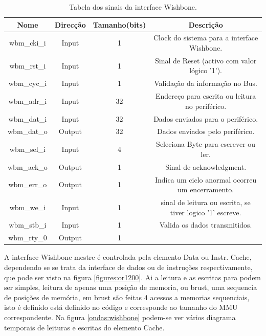 \begin{table}[h!]
  \begin{center}
    \begin{tabular}{|c|c|c|c|}
      \hline
      Nome & Direcção & Tamanho(bits) & Descrição \\
      \hline \hline
      wbm\_cki\_i & Input & 1 & Clock do sistema para a interface Wishbone. \\
      \hline
      wbm\_rst\_i & Input & 1 & Sinal de Reset (activo com valor lógico '1'). \\ 
      \hline
      wbm\_cyc\_i & Input & 1 & Validação da informação no Bus.\\ %
      \hline
      wbm\_adr\_i & Input & 32 & Endereço para escrita ou leitura no periférico.\\
      \hline
      wbm\_dat\_i & Input & 32 & Dados enviados para o periférico.\\
      \hline
      wbm\_dat\_o & Output & 32 & Dados enviados pelo periférico.\\
      \hline
      wbm\_sel\_i & Input & 4 & Seleciona Byte para escrever ou ler.\\ %
      \hline
      wbm\_ack\_o & Output & 1 & Sinal de acknowledgment. \\
      \hline
      wbm\_err\_o & Output & 1 & Indica um ciclo anormal ocorreu um encerramento.\\
      \hline
      wbm\_we\_i & Input & 1 & sinal de leitura ou escrita, se tiver logico '1' escreve.\\
      \hline
      wbm\_stb\_i & Input & 1 & Valida os dados transmitidos.\\
      \hline
      wbm\_rty\_0 & Output & 1 & \\
      \hline
    \end{tabular}
  \end{center}
  \caption[Tabela dos sinais da interface Wishbone.]{Tabela dos sinais da interface Wishbone.}
  \label{table:wishbone}
\end{table} 

A interface Wishbone mestre é controlada pela elemento Data ou Instr. Cache, dependendo se se trata da interface de dados ou de instruções respectivamente, que pode ser visto na figura \ref{figures:or1200}. Ai a leitura e as escritas para podem ser simples, leitura de apenas uma posição de memoria, ou brust, uma sequencia de posições de memória, em brust são feitas 4 acessos a memorias sequenciais, isto é definido está definido no código e corresponde ao tamanho do MMU correspondente. Na figura \ref{ondas:wishbone} podem-se ver vários diagrama temporais de leituras e escritas do elemento Cache.

